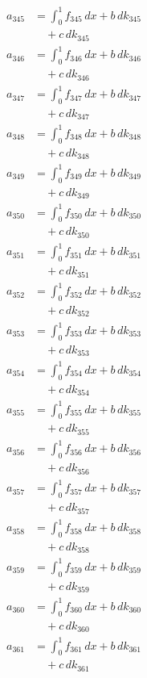 \documentclass{article}
\begin{document}
\begin{align}
a_{345} &= \int_0^1 f_{345}\,dx + b\,dk_{345} \\
&\quad + c\,dk_{345} \\
a_{346} &= \int_0^1 f_{346}\,dx + b\,dk_{346} \\
&\quad + c\,dk_{346} \\
a_{347} &= \int_0^1 f_{347}\,dx + b\,dk_{347} \\
&\quad + c\,dk_{347} \\
a_{348} &= \int_0^1 f_{348}\,dx + b\,dk_{348} \\
&\quad + c\,dk_{348} \\
a_{349} &= \int_0^1 f_{349}\,dx + b\,dk_{349} \\
&\quad + c\,dk_{349} \\
a_{350} &= \int_0^1 f_{350}\,dx + b\,dk_{350} \\
&\quad + c\,dk_{350} \\
a_{351} &= \int_0^1 f_{351}\,dx + b\,dk_{351} \\
&\quad + c\,dk_{351} \\
a_{352} &= \int_0^1 f_{352}\,dx + b\,dk_{352} \\
&\quad + c\,dk_{352} \\
a_{353} &= \int_0^1 f_{353}\,dx + b\,dk_{353} \\
&\quad + c\,dk_{353} \\
a_{354} &= \int_0^1 f_{354}\,dx + b\,dk_{354} \\
&\quad + c\,dk_{354} \\
a_{355} &= \int_0^1 f_{355}\,dx + b\,dk_{355} \\
&\quad + c\,dk_{355} \\
a_{356} &= \int_0^1 f_{356}\,dx + b\,dk_{356} \\
&\quad + c\,dk_{356} \\
a_{357} &= \int_0^1 f_{357}\,dx + b\,dk_{357} \\
&\quad + c\,dk_{357} \\
a_{358} &= \int_0^1 f_{358}\,dx + b\,dk_{358} \\
&\quad + c\,dk_{358} \\
a_{359} &= \int_0^1 f_{359}\,dx + b\,dk_{359} \\
&\quad + c\,dk_{359} \\
a_{360} &= \int_0^1 f_{360}\,dx + b\,dk_{360} \\
&\quad + c\,dk_{360} \\
a_{361} &= \int_0^1 f_{361}\,dx + b\,dk_{361} \\
&\quad + c\,dk_{361} \\

\end{align}
\end{document}
